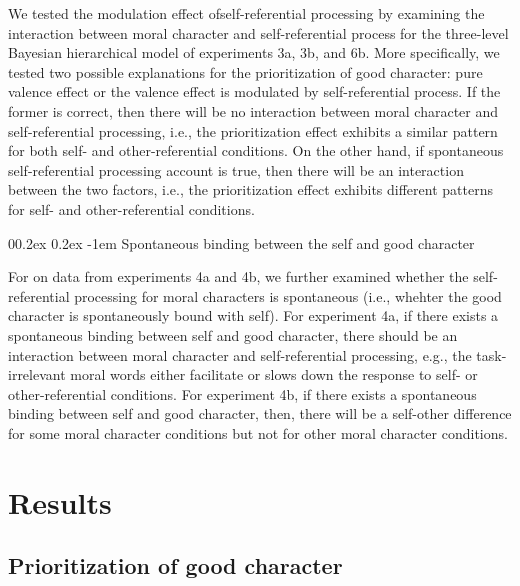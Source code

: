\documentclass[
  man]{apa6}
\makeatletter
\let\oldparagraph\paragraph
\renewcommand{\paragraph}[1]{\oldparagraph{#1}\mbox{}}
\renewcommand{\paragraph}{\@startsection{paragraph}{4}{\parindent}%
  {0\baselineskip \@plus 0.2ex \@minus 0.2ex}%
  {-1em}%
  {\normalfont\normalsize\bfseries\itshape\typesectitle}}
\makeatother
\begin{document}
We tested the modulation effect ofself-referential processing by examining the interaction between moral character and self-referential process for the three-level Bayesian hierarchical model of experiments 3a, 3b, and 6b. More specifically, we tested two possible explanations for the prioritization of good character: pure valence effect or the valence effect is modulated by self-referential process. If the former is correct, then there will be no interaction between moral character and self-referential processing, i.e., the prioritization effect exhibits a similar pattern for both self- and other-referential conditions. On the other hand, if spontaneous self-referential processing account is true, then there will be an interaction between the two factors, i.e., the prioritization effect exhibits different patterns for self- and other-referential conditions.

\hypertarget{spontaneous-binding-between-the-self-and-good-character}{%
\paragraph{Spontaneous binding between the self and good character}\label{spontaneous-binding-between-the-self-and-good-character}}

For on data from experiments 4a and 4b, we further examined whether the self-referential processing for moral characters is spontaneous (i.e., whehter the good character is spontaneously bound with self). For experiment 4a, if there exists a spontaneous binding between self and good character, there should be an interaction between moral character and self-referential processing, e.g., the task-irrelevant moral words either facilitate or slows down the response to self- or other-referential conditions. For experiment 4b, if there exists a spontaneous binding between self and good character, then, there will be a self-other difference for some moral character conditions but not for other moral character conditions.

\hypertarget{results}{%
\section{Results}\label{results}}

\hypertarget{prioritization-of-good-character}{%
\subsection{Prioritization of good character}\label{prioritization-of-good-character}}
\end{document}
